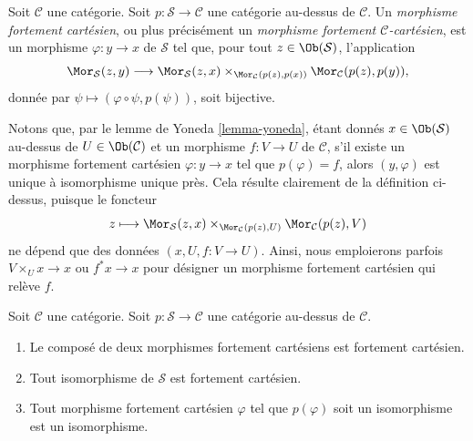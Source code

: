 \begin{definition}
\label{definition-cartesian-over-C}
Soit $\mathcal{C}$ une catégorie.
Soit $p : \mathcal{S} \to \mathcal{C}$ une catégorie au-dessus de
$\mathcal{C}$. Un {\it morphisme fortement cartésien}, ou plus précisément
un {\it morphisme fortement $\mathcal{C}$-cartésien}, est un
morphisme $\varphi : y \to x$ de $\mathcal{S}$ tel que, pour tout
$z \in \Ob(\mathcal{S})$, l'application
$$
\Mor_\mathcal{S}(z, y)
\longrightarrow
\Mor_\mathcal{S}(z, x)
\times_{\Mor_\mathcal{C}(p(z), p(x))}
\Mor_\mathcal{C}(p(z), p(y)),
$$
donnée par $\psi \longmapsto (\varphi \circ \psi, p(\psi))$,
soit bijective.
\end{definition}

\noindent
Notons que, par le lemme de Yoneda \ref{lemma-yoneda}, étant donnés
$x \in \Ob(\mathcal{S})$ au-dessus de $U \in \Ob(\mathcal{C})$
et un morphisme $f : V \to U$ de $\mathcal{C}$, s'il existe un
morphisme fortement cartésien $\varphi : y \to x$ tel que
$p(\varphi) = f$, alors $(y, \varphi)$ est unique à isomorphisme unique près.
Cela résulte clairement de la définition ci-dessus, puisque le foncteur
$$
z
\longmapsto
\Mor_\mathcal{S}(z, x)
\times_{\Mor_\mathcal{C}(p(z), U)}
\Mor_\mathcal{C}(p(z), V)
$$
ne dépend que des données $(x, U, f : V \to U)$. Ainsi, nous emploierons
parfois $V \times_U x \to x$ ou $f^*x \to x$ pour désigner un morphisme
fortement cartésien qui relève $f$.

\begin{lemma}
\label{lemma-composition-cartesian}
Soit $\mathcal{C}$ une catégorie.
Soit $p : \mathcal{S} \to \mathcal{C}$ une catégorie au-dessus de
$\mathcal{C}$.
\begin{enumerate}
\item Le composé de deux morphismes fortement cartésiens est fortement
cartésien.
\item Tout isomorphisme de $\mathcal{S}$ est fortement cartésien.
\item Tout morphisme fortement cartésien $\varphi$ tel que $p(\varphi)$
soit un isomorphisme est un isomorphisme.
\end{enumerate}
\end{lemma}

